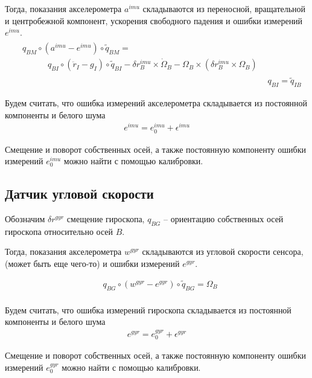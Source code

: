 \documentclass[a4paper,12pt]{article}
\begin{document}
Тогда, показания акселерометра $a^{imu}$ складываются из переносной, вращательной и центробежной компонент, ускорения свободного падения и ошибки измерений $e^{imu}$.
\begin{align} 
\begin{split} \label{eq:imu_mes}
&q_{BM} \circ (a^{imu} - e^{imu}) \circ \tilde{q}_{BM} = \\
&\quad \quad \quad {q}_{BI} \circ (\ddot{r}_{I} - g_I) \circ \tilde{q}_{BI}
 - {\delta r^{imu}_B}  \times \dot{\Omega}_B
 - \Omega_B \times (\delta r^{imu}_B \times \Omega_B)
\end{split}
\\
&q_{BI} = \tilde{q}_{IB}
\end{align}

Будем считать, что ошибка измерений акселерометра складывается из постоянной компоненты  и белого шума
\begin{align} 
e^{imu} = e_{0}^{imu} + \epsilon^{imu}
\end{align}

Смещение и поворот собственных осей, а также постоянную компоненту ошибки измерений $e_{0}^{imu}$ можно найти с помощью калибровки.

\subsection{Датчик угловой скорости}
Обозначим $\delta r^{\textit{gyr}}$ смещение гироскопа,  $q_{BG}$ -- ориентацию собственных осей гироскопа относительно осей $B$.

Тогда, показания акселерометра $w^{\textit{gyr}}$ складываются из угловой скорости сенсора, (может быть еще чего-то) и ошибки измерений $e^{\textit{gyr}}$.

\begin{align} 
&q_{BG} \circ (w^{\textit{gyr}} - e^{\textit{gyr}}) \circ \tilde{q}_{BG} = 
\Omega_B
\\
\end{align}

Будем считать, что ошибка измерений гироскопа складывается из постоянной компоненты  и белого шума
\begin{align} 
e^{\textit{gyr}} = e_{0}^{\textit{gyr}} + \epsilon^{\textit{gyr}}
\end{align}

Смещение и поворот собственных осей, а также постоянную компоненту ошибки измерений $e_{0}^{\textit{gyr}}$ можно найти с помощью калибровки.
\end{document}
